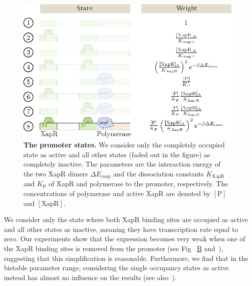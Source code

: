 \documentclass[10pt,letterpaper]{article}
\newcommand{\n}[1]{\mathrm{#1}}
\newcommand\subref[2]{%
	\def\myref{\getrefnumber{#1}}%
	\hyperref[#1]{\myref\mbox{#2}}%
}
\begin{document}
	\begin{figure}%
		\centering
		\includegraphics{media/Fig3_states.eps}
		\caption{{\bf The promoter states.} We consider only the completely
			occupied state as active and all other states (faded out in the figure)
			as completely inactive. The parameters are the interaction energy of
			the two XapR dimers $\Delta E_{\n{coop}}$ and the dissociation
			constants $K_{\n{XapR}}$ and $K_{\n{P}}$ of XapR and polymerase
			to the promoter, respectively. The concentrations of polymerase
			and active XapR are denoted by $\n{[P]}$ and $\n{[XapR]}$.}
		\label{fig3:states}
	\end{figure}
	
	We consider only the state where both XapR binding sites are occupied as
	active and all other states as inactive, meaning they have transcription
	rate equal to zero. Our experiments show that the expression becomes very weak when one of
	the XapR binding sites is removed from the promoter (see
	Fig~\subref{fig1:data}{B} and~), suggesting that
	this simplification is reasonable. Furthermore, we find that in
	the bistable parameter range, considering the single occupancy states as
	active instead has almost no influence on the results (see
	also~).
	
\end{document}
